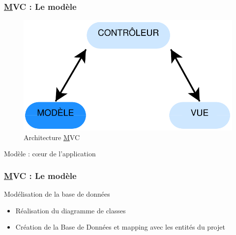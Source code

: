 \speaker{\Michel}

\begin{frame}
\frametitle{\underline{M}VC : Le modèle}
\begin{figure}[!h]
	\begin{center}
	\includegraphics[scale=0.5]{images/mvcModele}
	\caption{Architecture \underline{M}VC}
	\end{center}
\end{figure}
Modèle :   cœur de l'application
\end{frame}


\begin{frame}
	\frametitle{\underline{M}VC : Le modèle}
	\begin{block}{Modélisation de la base de données}	
		\begin{itemize}
			\item Réalisation du diagramme de classes
			\item Création de la Base de Données et mapping avec les entités du projet
		\end{itemize}
	\end{block}
\end{frame}


